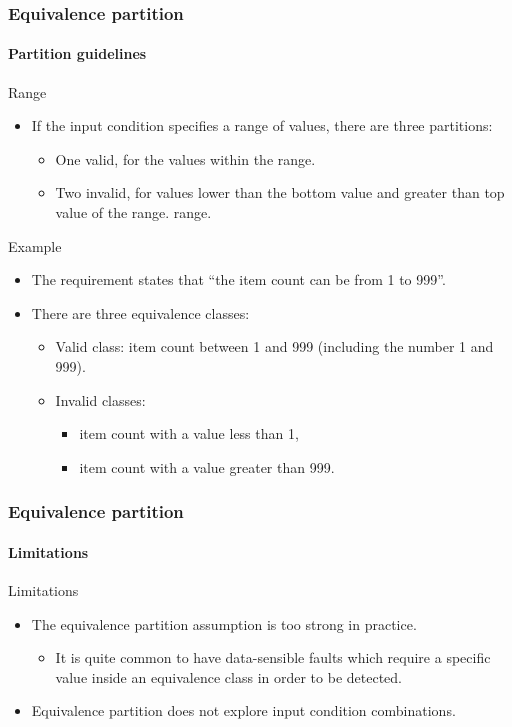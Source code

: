 \begin{frame}
\frametitle{Equivalence partition}
\framesubtitle{Partition guidelines}

\begin{block:fact}{Range}
\begin{itemize}
	\item If the input condition specifies a range of values, there are three
	partitions:
	\begin{itemize}
		\item One valid, for the values within the range.

		\item Two invalid, for values lower than the bottom value and greater
		than top value of the range.
		range.
	\end{itemize}
\end{itemize}
\end{block:fact}


\begin{block}{Example}
\begin{itemize}
	\item The requirement states that ``the item count can be from 1 to 999''.

	\item There are three equivalence classes:
	\begin{itemize}
		\item Valid class: item count between 1 and 999 (including the number
		1 and 999).
		\item Invalid classes:
		\begin{itemize}
			\item item count with a value less than 1,
			\item item count with a value greater than 999.
		\end{itemize}
	\end{itemize}
\end{itemize}
\end{block}
\end{frame}



\begin{frame}[hasprev=true, hasnext=false]
\frametitle{Equivalence partition}
\framesubtitle{Limitations}

\begin{block:fact}{Limitations}
\begin{itemize}
	\item The equivalence partition assumption is too strong in practice.
	\begin{itemize}
		\item It is quite common to have data-sensible faults which require a
		specific value inside an equivalence class in order to be detected.
	\end{itemize}

	\item Equivalence partition does not explore input condition combinations.
\end{itemize}
\end{block:fact}
\end{frame}